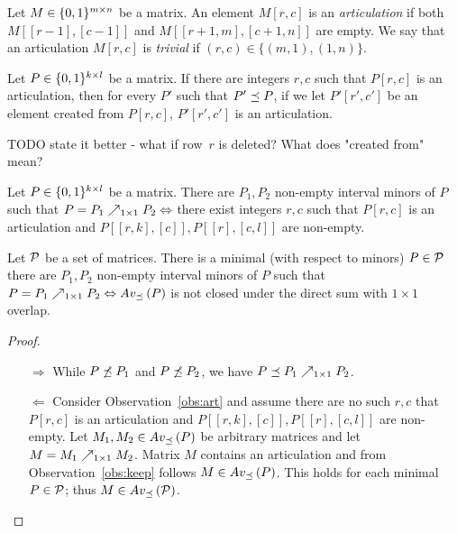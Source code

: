 \begin{defn}
Let $M\in\{0,1\}^{m\times n}$ be a matrix. An element $M[r,c]$ is an \emph{articulation} if both $M[[r-1],[c-1]]$ and $M[[r+1,m],[c+1,n]]$ are empty. We say that an articulation $M[r,c]$ is \emph{trivial} if $(r,c)\in\{(m,1),(1,n)\}$.
\end{defn}

\begin{obs}
\label{obs:keep}
Let $P\in\{0,1\}^{k\times l}$ be a matrix. If there are integers $r,c$ such that $P[r,c]$ is an articulation, then for every $P'$ such that $P'\preceq P$, if we let $P'[r',c']$ be an element created from $P[r,c]$, $P'[r',c']$ is an articulation.

TODO state it better - what if row~$r$ is deleted? What does "created from" mean?
\end{obs}

\begin{obs}
\label{obs:art}
Let $P\in\{0,1\}^{k\times l}$ be a matrix. There are $P_1,P_2$ non-empty interval minors of $P$ such that $P=P_1\nearrow_{1\times1}P_2\Leftrightarrow$ there exist integers $r,c$ such that $P[r,c]$ is an articulation and $P[[r,k],[c]],P[[r],[c,l]]$ are non-empty.
\end{obs}

\begin{obs}
\label{obs:rel}
Let $\mathcal{P}$ be a set of matrices. There is a minimal (with respect to minors) $P\in\mathcal{P}$ there are $P_1,P_2$ non-empty interval minors of $P$ such that $P=P_1\nearrow_{1\times1}P_2\Leftrightarrow Av_{\preceq}\left(P\right)$ is not closed under the direct sum with $1\times1$ overlap.
\end{obs}
\begin{proof}
\begin{itemize}
	\item[$\Rightarrow$] While $P\not\preceq P_1$ and $P\not\preceq P_2$, we have $P\preceq P_1\nearrow_{1\times1}P_2$.
	\item[$\Leftarrow$] Consider Observation~\ref{obs:art} and assume there are no such $r,c$ that $P[r,c]$ is an articulation and $P[[r,k],[c]],P[[r],[c,l]]$ are non-empty. Let $M_1,M_2\in Av_{\preceq}\left(P\right)$ be arbitrary matrices and let $M=M_1\nearrow_{1\times1}M_2$. Matrix $M$ contains an articulation and from Observation~\ref{obs:keep} follows $M\in Av_{\preceq}\left(P\right)$. This holds for each minimal $P\in\mathcal{P}$; thus $M\in Av_{\preceq}\left(\mathcal{P}\right)$.
\end{itemize}
\end{proof}

